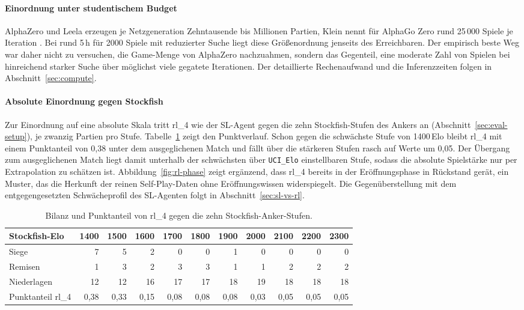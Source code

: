 \documentclass[
  a4paper, 12pt,
  parskip=half,
  headings=small,
  bibliography=totoc
]{scrartcl}
\begin{document}
\paragraph{Einordnung unter studentischem Budget}
AlphaZero und Leela erzeugen je Netzgeneration Zehntausende bis Millionen Partien, Klein nennt für AlphaGo Zero rund 25\,000 Spiele je Iteration \autocite{klein2022neural}.
Bei rund 5\,h für 2000 Spiele mit reduzierter Suche liegt diese Größenordnung jenseits des Erreichbaren. Der empirisch beste Weg war daher nicht zu versuchen, die Game-Menge von AlphaZero nachzuahmen, sondern das Gegenteil, eine moderate Zahl von
Spielen bei hinreichend starker Suche über möglichst viele gegatete Iterationen. Der detaillierte Rechenaufwand und die Inferenzzeiten folgen in Abschnitt~\ref{sec:compute}.

\paragraph{Absolute Einordnung gegen Stockfish}
Zur Einordnung auf eine absolute Skala tritt rl\_4 wie der SL-Agent gegen die zehn Stockfish-Stufen des Ankers an (Abschnitt~\ref{sec:eval-setup}), je zwanzig Partien pro Stufe. Tabelle~\ref{tab:rl-anchor} zeigt den Punktverlauf.
Schon gegen die schwächste Stufe von 1400\,Elo bleibt rl\_4 mit einem Punktanteil von 0{,}38 unter dem ausgeglichenen Match und fällt über die stärkeren Stufen rasch auf Werte um 0{,}05. Der Übergang zum ausgeglichenen Match liegt damit unterhalb der schwächsten über \texttt{UCI\_Elo} einstellbaren Stufe, sodass die absolute Spielstärke nur per Extrapolation zu schätzen ist. 
Abbildung~\ref{fig:rl-phase} zeigt ergänzend, dass rl\_4 bereits in der Eröffnungsphase in Rückstand gerät, ein Muster, das die Herkunft der reinen Self-Play-Daten ohne Eröffnungswissen widerspiegelt. 
Die Gegenüberstellung mit dem entgegengesetzten Schwächeprofil des SL-Agenten folgt in Abschnitt~\ref{sec:sl-vs-rl}.
\begin{table}[htbp]
  \centering
  \small
  \begin{tabular}{lrrrrrrrrrr}
    \toprule
    Stockfish-Elo     & 1400 & 1500 & 1600 & 1700 & 1800 & 1900 & 2000 & 2100 & 2200 & 2300 \\
    \midrule
    Siege             &      7 &      5 &      2 &      0 &      0 &      1 &      0 &      0 &      0 &      0 \\
    Remisen           &      1 &      3 &      2 &      3 &      3 &      1 &      1 &      2 &      2 &      2 \\
    Niederlagen       &     12 &     12 &     16 &     17 &     17 &     18 &     19 &     18 &     18 &     18 \\
    \addlinespace
    Punktanteil rl\_4 & 0{,}38 & 0{,}33 & 0{,}15 & 0{,}08 & 0{,}08 & 0{,}08 & 0{,}03 & 0{,}05 & 0{,}05 & 0{,}05 \\
    \bottomrule
  \end{tabular}
  \caption{Bilanz und Punktanteil von rl\_4 gegen die zehn Stockfish-Anker-Stufen.}
  \label{tab:rl-anchor}
\end{table}
\end{document}

